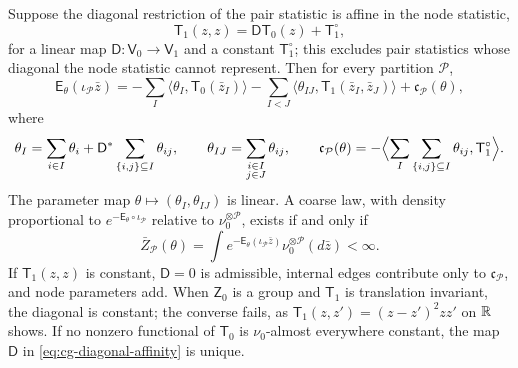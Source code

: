 Suppose the diagonal restriction of the pair statistic is affine in the node
statistic,
\begin{equation}
\mathsf T_1(z,z)=\mathsf D \mathsf T_0(z)+\mathsf T_1^\circ,
\label{eq:cg-diagonal-affinity}
\end{equation}
for a linear map \(\mathsf D:\mathsf V_0\to\mathsf V_1\) and a constant
\(\mathsf T_1^\circ\); this excludes pair statistics whose diagonal the node statistic
cannot represent. Then for every partition \(\mathcal P\),
\begin{equation}
\mathsf E_\theta(\iota_{\mathcal P}\bar z)
=-\sum_I\langle\theta_I,\mathsf T_0(\bar z_I)\rangle
-\sum_{I<J}\langle\theta_{IJ},\mathsf T_1(\bar z_I,\bar z_J)\rangle
+\mathfrak c_{\mathcal P}(\theta),
\label{eq:cg-coarse-energy}
\end{equation}
where
\begin{equation}
\theta_I=\sum_{i\in I}\theta_i
+\mathsf D^\ast\sum_{\{i,j\}\subseteq I}\theta_{ij},
\qquad
\theta_{IJ}=\sum_{\substack{i\in I\\j\in J}}\theta_{ij},
\qquad
\mathfrak c_{\mathcal P}(\theta)
=-\Bigl\langle\sum_I\sum_{\{i,j\}\subseteq I}\theta_{ij},\mathsf T_1^\circ\Bigr\rangle .
\label{eq:cg-coarse-parameters}
\end{equation}
The parameter map \(\theta\mapsto(\theta_I,\theta_{IJ})\) is linear. A coarse
law, with density proportional to \(e^{-\mathsf E_\theta\circ\iota_{\mathcal P}}\)
relative to \(\nu_0^{\otimes\mathcal P}\), exists if and only if
\begin{equation}
\bar Z_{\mathcal P}(\theta)
=\int e^{-\mathsf E_\theta(\iota_{\mathcal P}\bar z)}
\nu_0^{\otimes\mathcal P}(d\bar z)<\infty .
\label{eq:cg-coarse-normalizer}
\end{equation}
If \(\mathsf T_1(z,z)\) is constant, \(\mathsf D=0\) is admissible, internal edges
contribute only to \(\mathfrak c_{\mathcal P}\), and node parameters add. When
\(\mathsf Z_0\) is a group and \(\mathsf T_1\) is translation invariant, the diagonal
is constant; the converse fails, as \(\mathsf T_1(z,z')=(z-z')^2zz'\) on \(\mathbb R\) shows.
If no nonzero functional of \(\mathsf T_0\) is \(\nu_0\)-almost everywhere constant,
the map \(\mathsf D\) in \eqref{eq:cg-diagonal-affinity} is unique.

